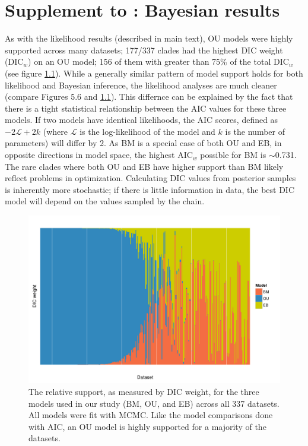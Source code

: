 \chapter{Supplement to : Bayesian results}

As with the likelihood results (described in main text), OU models were highly supported across many datasets; 
177/337 clades had the highest DIC weight (DIC$_w$) on an OU model; 156 of them with greater than 75\% of the total DIC$_w$ (see figure \ref{fig:supp-dic-support}). While a generally similar pattern of model support holds for both likelihood and Bayesian inference, the likelihood analyses are much cleaner (compare Figures 5.6 and \ref{fig:supp-dic-support}). This differnce can be explained by the fact that there is a tight statistical relationship between the AIC values for these three models. If two models have identical likelihoods, the AIC scores, defined as $-\text{2}\mathcal{L} + \text{2}k$ (where $\mathcal{L}$ is the log-likelihood of the model and $k$ is the number of parameters) will differ by 2. As BM is a special case of both OU and EB, in opposite directions in model space, the highest AIC$_w$ possible for BM is $\sim$0.731. The rare clades where both OU and EB have higher support than BM likely reflect problems in optimization. Calculating DIC values from posterior samples is inherently more stochastic; if there is little information in data, the best DIC model will depend on the values sampled by the chain.

\begin{figure}[p]
  \centering
  \includegraphics[angle=90, origin=c, scale=0.8]{figs/dic-support}
  \caption[Relative support for models across angiosperms (Bayesian)]{The relative support, as measured by DIC weight, for the three models used in our study (BM, OU, and EB) across all 337 datasets. All models were fit with MCMC. Like the model comparisons done with AIC, an OU model is highly supported for a majority of the datasets.}
  \label{fig:supp-dic-support}
\end{figure} 

